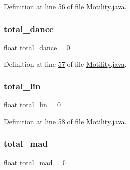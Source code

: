 Definition at line \hyperlink{_motility_8java_source_l00056}{56} of file \hyperlink{_motility_8java_source}{Motility.\+java}.

\hypertarget{classanalysis_1_1_motility_aac49177d1bc39508a93db152eb8f8c61}{}\label{classanalysis_1_1_motility_aac49177d1bc39508a93db152eb8f8c61} 
\subsubsection{\texorpdfstring{total\+\_\+dance}{total\_dance}}
{\footnotesize\ttfamily float total\+\_\+dance = 0\hspace{0.3cm}{\ttfamily [private]}}



Definition at line \hyperlink{_motility_8java_source_l00057}{57} of file \hyperlink{_motility_8java_source}{Motility.\+java}.

\hypertarget{classanalysis_1_1_motility_a051b97e22d0b6acb0d861dd7e4e26f94}{}\label{classanalysis_1_1_motility_a051b97e22d0b6acb0d861dd7e4e26f94} 
\subsubsection{\texorpdfstring{total\+\_\+lin}{total\_lin}}
{\footnotesize\ttfamily float total\+\_\+lin = 0\hspace{0.3cm}{\ttfamily [private]}}



Definition at line \hyperlink{_motility_8java_source_l00058}{58} of file \hyperlink{_motility_8java_source}{Motility.\+java}.

\hypertarget{classanalysis_1_1_motility_a5c428e4bdee1a7aa6c30ce2789a781db}{}\label{classanalysis_1_1_motility_a5c428e4bdee1a7aa6c30ce2789a781db} 
\subsubsection{\texorpdfstring{total\+\_\+mad}{total\_mad}}
{\footnotesize\ttfamily float total\+\_\+mad = 0\hspace{0.3cm}{\ttfamily [private]}}



